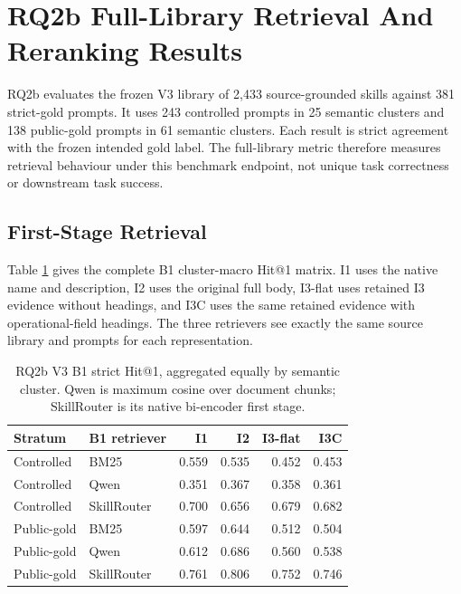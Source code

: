 \section{RQ2b Full-Library Retrieval And Reranking Results}
\label{sec:rq2b-full-library-results}

RQ2b evaluates the frozen V3 library of 2,433 source-grounded skills against 381 strict-gold prompts. It uses 243 controlled prompts in 25 semantic clusters and 138 public-gold prompts in 61 semantic clusters. Each result is strict agreement with the frozen intended gold label. The full-library metric therefore measures retrieval behaviour under this benchmark endpoint, not unique task correctness or downstream task success.

\subsection{First-Stage Retrieval}

Table \ref{tab:rq2b-b1-h1} gives the complete B1 cluster-macro Hit@1 matrix. I1 uses the native name and description, I2 uses the original full body, I3-flat uses retained I3 evidence without headings, and I3C uses the same retained evidence with operational-field headings. The three retrievers see exactly the same source library and prompts for each representation.

\begin{table}[H]
\centering
\scriptsize
\setlength{\tabcolsep}{3pt}
\begin{tabular}{llrrrr}
\toprule
Stratum & B1 retriever & I1 & I2 & I3-flat & I3C \\
\midrule
Controlled & BM25 & 0.559 & 0.535 & 0.452 & 0.453 \\
Controlled & Qwen & 0.351 & 0.367 & 0.358 & 0.361 \\
Controlled & SkillRouter & 0.700 & 0.656 & 0.679 & 0.682 \\
\midrule
Public-gold & BM25 & 0.597 & 0.644 & 0.512 & 0.504 \\
Public-gold & Qwen & 0.612 & 0.686 & 0.560 & 0.538 \\
Public-gold & SkillRouter & 0.761 & 0.806 & 0.752 & 0.746 \\
\bottomrule
\end{tabular}
\caption{RQ2b V3 B1 strict Hit@1, aggregated equally by semantic cluster. Qwen is maximum cosine over document chunks; SkillRouter is its native bi-encoder first stage.}
\label{tab:rq2b-b1-h1}
\end{table}

